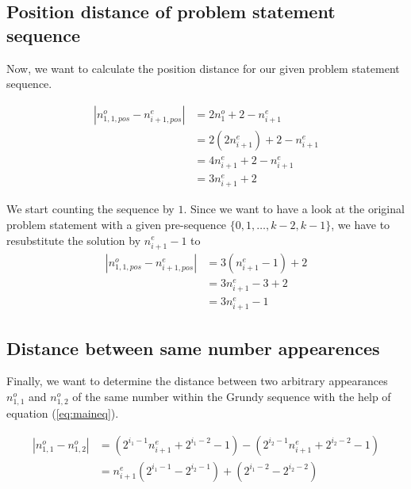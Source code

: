 \documentclass[12pt]{../document-templates/papers/one-column-mydashie/mydashie}
\newtheorem*{theorem A}{Theorem A}
\newtheorem*{theorem B}{N\"olker's Theorem}
\theoremstyle{remark}
\theoremstyle{remark}
\begin{document}
\subsection{Position distance of problem statement sequence}
\label{ss:positiondistanceoffproblemstatementsequence}
Now, we want to calculate the position distance for our given problem statement sequence.

\begin{equation}
    \begin{split}
        |n_{1,1,pos}^{o} - n_{i+1,pos}^{e}| &= 2n_{1}^{o} + 2 - n_{i+1}^{e}\\
            &= 2\left(2n_{i+1}^{e}\right) + 2 - n_{i+1}^{e}\\
            &= 4n_{i+1}^{e} + 2 - n_{i+1}^{e}\\
            &= 3n_{i+1}^{e} + 2
    \end{split}
\label{eq:posdist}
\end{equation}

We start counting the sequence by $1$. Since we want to have a look at the original problem statement with a given pre-sequence $\{0,1,\dots, k-2,k-1\}$, we have to resubstitute the solution by $n_{i+1}^{e} - 1$ to
\begin{equation}
    \begin{split}
        |n_{1,1,pos}^{o} - n_{i+1,pos}^{e}| &= 3\left(n_{i+1}^{e} - 1\right) + 2\\
            &= 3n_{i+1}^{e} - 3 + 2\\
            &= 3n_{i+1}^{e} - 1
    \end{split}
\label{eq:resubsol}
\end{equation}
\subsection{Distance between same number appearences}
\label{ss:distancebetweenstamenumberappearences}
Finally, we want to determine the distance between two arbitrary appearances $n_{1,1}^{o}$ and $n_{1,2}^{o}$ of the same number within the Grundy sequence with the help of equation (\ref{eq:maineq}).

\begin{equation}
    \begin{split}
        |n_{1,1}^{o} - n_{1,2}^{o}| &= \left(2^{i_{1} - 1}n_{i+1}^{e} + 2^{i_{1}-2} - 1\right) - \left(2^{i_{2} - 1}n_{i+1}^{e} + 2^{i_{2}-2} - 1\right)\\
            &= n_{i+1}^{e}\left(2^{i_{1} - 1} - 2^{i_{2} - 1}\right) + \left(2^{i_{1} - 2} - 2^{i_{2} - 2}\right)
    \end{split}
\label{eq:samenumberapp_p1}
\end{equation}
\end{document}
